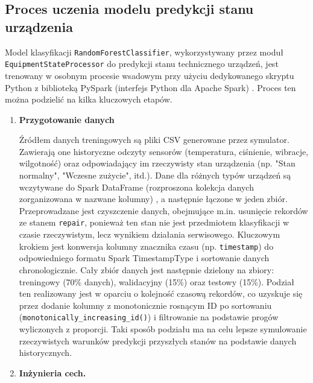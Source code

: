 \subsection{Proces uczenia modelu predykcji stanu urządzenia}
\label{sec:uczenie_modelu_stanu}

Model klasyfikacji \texttt{RandomForestClassifier}, wykorzystywany przez moduł \\
\texttt{EquipmentStateProcessor} do predykcji stanu technicznego urządzeń, jest trenowany w osobnym procesie wsadowym przy użyciu dedykowanego skryptu Python z biblioteką PySpark (interfejs Python dla Apache Spark) \cite{pyspark_docs}. Proces ten można podzielić na kilka kluczowych etapów.

\begin{enumerate}

    \item \textbf{Przygotowanie danych}

Źródłem danych treningowych są pliki CSV generowane przez symulator. Zawierają one historyczne odczyty sensorów (temperatura, ciśnienie, wibracje, wilgotność) oraz odpowiadający im rzeczywisty stan urządzenia (np. "Stan normalny", "Wczesne zużycie", itd.). Dane dla różnych typów urządzeń są wczytywane do Spark DataFrame (rozproszona kolekcja danych zorganizowana w nazwane kolumny) \cite{spark_dataframe} , a następnie łączone w jeden zbiór. Przeprowadzane jest czyszczenie danych, obejmujące m.in. usunięcie rekordów ze stanem \texttt{repair}, ponieważ ten stan nie jest przedmiotem klasyfikacji w czasie rzeczywistym, lecz wynikiem działania serwisowego. Kluczowym krokiem jest konwersja kolumny znacznika czasu (np. \texttt{timestamp}) do odpowiedniego formatu Spark TimestampType i sortowanie danych chronologicznie. Cały zbiór danych jest następnie dzielony na zbiory: treningowy (70\% danych), walidacyjny (15\%) oraz testowy (15\%). Podział ten realizowany jest w oparciu o kolejność czasową rekordów, co uzyskuje się przez dodanie kolumny z monotonicznie rosnącym ID po sortowaniu (\texttt{monotonically\_increasing\_id()}) i filtrowanie na podstawie progów wyliczonych z proporcji. Taki sposób podziału ma na celu lepsze symulowanie rzeczywistych warunków predykcji przyszłych stanów na podstawie danych historycznych.

 \item \textbf{Inżynieria cech.}


\end{enumerate}
